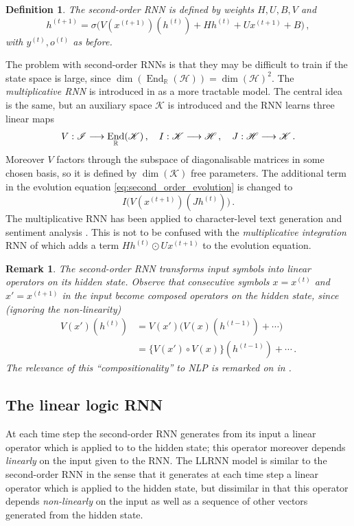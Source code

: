 \documentclass[english,letter paper,12pt,leqno]{article}
\theoremstyle{example}
\newtheorem{definition}[theorem]{Definition}
\newtheorem{remark}[theorem]{Remark}
\numberwithin{equation}{section}
\def\be{\begin{equation}}
\def\ee{\end{equation}}
\DeclareMathOperator{\End}{End}
\begin{document}
\begin{definition} The second-order RNN \cite{highorderrec,pollack} is defined by weights $H,U,B,V$ and
\be\label{eq:second_order_evolution}
h^{(t+1)} = \sigma\big( V( x^{(t+1)} )(h^{(t)}) + H h^{(t)} + U x^{(t+1)} + B\big)\,,
\ee 
with $y^{(t)}, o^{(t)}$ as before.
\end{definition}

The problem with second-order RNNs is that they may be difficult to train if the state space is large, since $\dim(\End_{\mathbb{R}}(\mathscr{H})) = \dim(\mathscr{H})^2$. The \emph{multiplicative RNN} is introduced in \cite{sutskever} as a more tractable model. The central idea is the same, but an auxiliary space $\mathscr{K}$ is introduced and the RNN learns three linear maps
\be\label{eq:threelinearmaps}
V: \mathscr{I} \lto \End_{\mathbb{R}}(\mathscr{K})\,, \quad I: \mathscr{K} \lto \mathscr{H}\,, \quad J: \mathscr{H} \lto \mathscr{K}\,.
\ee
Moreover $V$ factors through the subspace of diagonalisable matrices in some chosen basis, so it is defined by $\dim(\mathscr{K})$ free parameters. The additional term in the evolution equation \eqref{eq:second_order_evolution} is changed to
\be\label{eq:new_term_mRNN}
I\big( V(x^{(t+1)})( J h^{(t)} ) \big)\,.
\ee
The multiplicative RNN has been applied to character-level text generation \cite{sutskever} and sentiment analysis \cite{irsoy}. This is not to be confused with the \emph{multiplicative integration} RNN of \cite{yuhai} which adds a term $H h^{(t)} \odot U x^{(t+1)}$ to the evolution equation.

\begin{remark}
The second-order RNN transforms input symbols into linear operators on its hidden state. Observe that consecutive symbols $x = x^{(t)}$ and $x' = x^{(t+1)}$ in the input become composed operators on the hidden state, since (ignoring the non-linearity)
\begin{align*}
V(x')(h^{(t)}) &= V(x')\big( V(x)(h^{(t-1)}) + \cdots)\\
&= \big\{ V(x') \circ V(x) \big\}( h^{(t-1)} ) + \cdots\,.
\end{align*}
The relevance of this ``compositionality'' to NLP is remarked on in \cite{irsoy}.
\end{remark}


\subsection{The linear logic RNN}

At each time step the second-order RNN generates from its input a linear operator which is applied to to the hidden state; this operator moreover depends \emph{linearly} on the input given to the RNN. The LLRNN model is similar to the second-order RNN in the sense that it generates at each time step a linear operator which is applied to the hidden state, but dissimilar in that this operator depends \emph{non-linearly} on the input as well as a sequence of other vectors generated from the hidden state.
\end{document}
